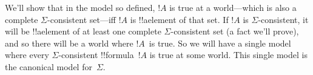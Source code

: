 \documentclass[../../../include/open-logic-section]{subfiles}
\begin{document}
We'll show that in the model so defined, $!A$ is true at a
world---which is also a complete $\Sigma$-consistent set---iff $!A$ is
!!a{element} of that set.  If $!A$ is $\Sigma$-consistent, it will be
!!a{element} of at least one complete $\Sigma$-consistent set (a fact
we'll prove), and so there will be a world where $!A$~is true. So we
will have a single model where every $\Sigma$-consistent
!!{formula}~$!A$ is true at some world.  This single model is the
canonical model for~$\Sigma$.
\end{document}
